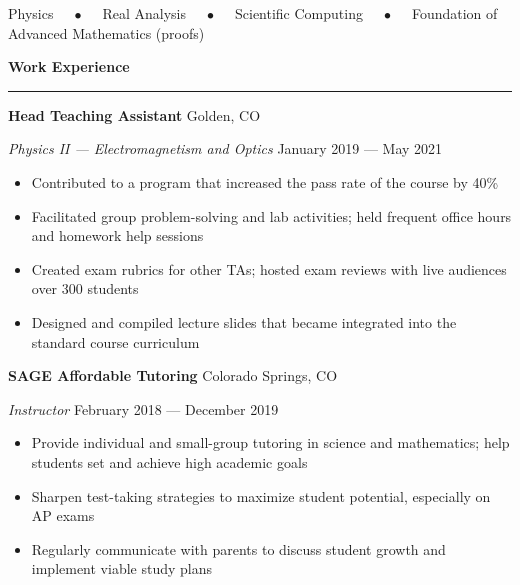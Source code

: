\documentclass{article}
\numberwithin{equation}{section}
\begin{document}
\hspace{3.0em} Physics $\quad\bullet\quad$ Real Analysis $\quad\bullet\quad$ Scientific Computing $\quad\bullet\quad$ Foundation of Advanced Mathematics (proofs)

\vspace{1em}

\textbf{\Large{Work Experience}} \\[-0.5em]
\rule{\textwidth}{1pt}

\hspace{1.5em} \textbf{Head Teaching Assistant} \hfill Golden, CO

\hspace{1.5em} \textit{Physics II --- Electromagnetism and Optics} \hfill January 2019 --- May 2021

\vspace{-0.5em}

\begin{itemize}[leftmargin=6.0em]
\setlength{\itemsep}{0em}
\item Contributed to a program that increased the pass rate of the course by 40\%
\item Facilitated group problem-solving and lab activities; held frequent office hours and homework help sessions
\item Created exam rubrics for other TAs; hosted exam reviews with live audiences over 300 students
\item Designed and compiled lecture slides that became integrated into the standard course curriculum
\end{itemize}

\hspace{1.5em} \textbf{SAGE Affordable Tutoring} \hfill Colorado Springs, CO

\hspace{1.5em} \textit{Instructor} \hfill February 2018 --- December 2019

\vspace{-0.5em}

\begin{itemize}[leftmargin=6.0em]
\setlength{\itemsep}{0em}
\item Provide individual and small-group tutoring in science and mathematics; help students set and achieve high academic goals
\item Sharpen test-taking strategies to maximize student potential, especially on AP exams
\item Regularly communicate with parents to discuss student growth and implement viable study plans
\end{itemize}
\end{document}
